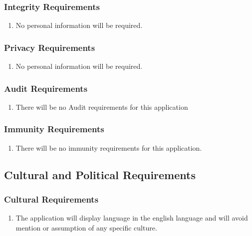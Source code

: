 \documentclass[12pt, titlepage]{article}
\begin{document}
\subsubsection{Integrity Requirements}
\label{ssub:integrity_requirements}
\begin{enumerate}[{SR}1. ]
	\item No personal information will be required.
\end{enumerate}

\subsubsection{Privacy Requirements}
\label{ssub:privacy_requirements}
\begin{enumerate}[{SR}1. ]
	\item No personal information will be required.
\end{enumerate}

\subsubsection{Audit Requirements}
\label{ssub:audit_requirements}
\begin{enumerate}[{SR}1. ]
	\item There will be no Audit requirements for this application
\end{enumerate}

\subsubsection{Immunity Requirements}
\label{ssub:immunity_requirements}
\begin{enumerate}[{SR}1. ]
	\item There will be no immunity requirements for this application.
\end{enumerate}


\subsection{Cultural and Political Requirements}
\label{sub:cultural_and_political_requirements}

\subsubsection{Cultural Requirements}
\label{ssub:cultural_requirements}
\begin{enumerate}[{CP}1. ]
	\item The application will display language in the english language and will avoid mention or assumption of any specific culture.
\end{enumerate}
\end{document}
